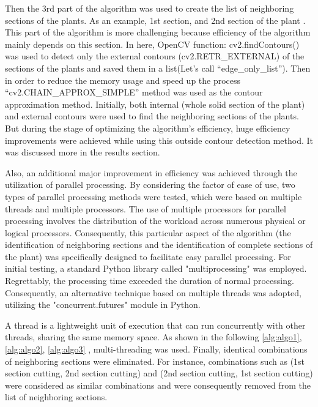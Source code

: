 \documentclass[]{iat}
\begin{document}
Then the 3rd part of the algorithm was used to create the list of neighboring sections of the plants. As an example, 1st section, and 2nd section of the plant . This part of the algorithm is more challenging because efficiency of the algorithm mainly depends on this section. In here, OpenCV function: cv2.findContours() was used to detect only the external contours (cv2.RETR\_EXTERNAL) of the sections of the plants and saved them in a list(Let’s call “edge\_only\_list”). Then in order to reduce the memory usage and speed up the process “cv2.CHAIN\_APPROX\_SIMPLE” method was used as the contour approximation method. Initially, both internal (whole solid section of the plant) and external contours were used to find the neighboring sections of the plants. But during the stage of optimizing the algorithm’s efficiency, huge efficiency improvements were achieved while using this outside contour detection method. It was discussed more in the results section.
\par
Also, an additional major improvement in efficiency was achieved through the utilization of parallel processing. By considering the factor of ease of use, two types of parallel processing methods were tested, which were based on multiple threads and multiple processors. The use of multiple processors for parallel processing involves the distribution of the workload across numerous physical or logical processors. Consequently, this particular aspect of the algorithm (the identification of neighboring sections and the identification of complete sections of the plant) was specifically designed to facilitate easy parallel processing. For initial testing, a standard Python library called "multiprocessing" was employed. Regrettably, the processing time exceeded the duration of normal processing. Consequently, an alternative technique based on multiple threads was adopted, utilizing the "concurrent.futures" module in Python.
\par
A thread is a lightweight unit of execution that can run concurrently with other threads, sharing the same memory space. As shown in the following  \autoref{alg:algo1}, \autoref{alg:algo2},  \autoref{alg:algo3} , multi-threading was used. Finally, identical combinations of neighboring sections were eliminated. For instance, combinations such as (1st section cutting, 2nd section cutting) and (2nd section cutting, 1st section cutting) were considered as similar combinations and were consequently removed from the list of neighboring sections.
\par
\FloatBarrier
\clearpage
\end{document}

